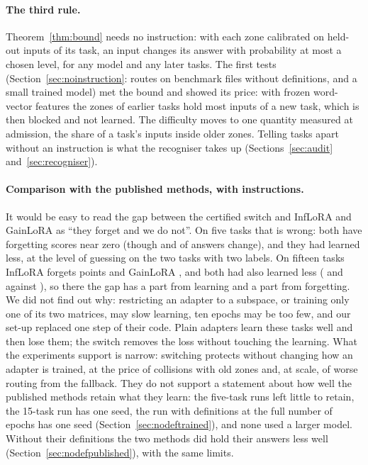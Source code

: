\paragraph{The third rule.} Theorem~\ref{thm:bound} needs no instruction: with each zone calibrated on
held-out inputs of its task, an input changes its answer with probability at most a chosen level, for
any model and any later tasks. The first tests (Section~\ref{sec:noinstruction}: routes on benchmark files without definitions, and a small trained model) met the bound and showed its
price: with frozen word-vector features the zones of earlier tasks hold most inputs of a new task, which
is then blocked and not learned. The difficulty moves to one quantity measured at admission, the share
of a task's inputs inside older zones. Telling tasks apart without an instruction is what the
recogniser takes up (Sections~\ref{sec:audit} and~\ref{sec:recogniser}).

\paragraph{Comparison with the published methods, with instructions.} It would be easy to read the gap
between the certified switch and InfLoRA and GainLoRA as ``they forget and we do not''. On five tasks
that is wrong: both have forgetting scores near zero (though \FiveInfChanged{} and \FiveGainChanged{} of
\FiveInfCompared{} answers change), and they had learned less, at the level of guessing on the two tasks
with two labels. On fifteen tasks InfLoRA forgets \FifteenInfFT{} points and GainLoRA \FifteenGainFT{},
and both had also learned less (\FifteenInfLearned{} and \FifteenGainLearned{} against
\FifteenCertLearned{}), so there the gap has a part from learning and a part from forgetting. We did not find out why: restricting an adapter to a subspace, or training only one of its two matrices, may slow learning,
ten epochs may be too few, and our set-up replaced one step of their code. Plain adapters learn these tasks well and then lose them; the switch removes the loss without touching the learning. What the experiments
support is narrow: switching protects without changing how an adapter is trained, at the price of
collisions with old zones and, at scale, of worse routing from the fallback. They do not support a statement about how
well the published methods retain what they learn: the five-task runs left little to retain, the 15-task run has one seed, the run with definitions at the full number of epochs has one seed (Section~\ref{sec:nodeftrained}), and none used a larger model. Without their definitions the two methods did hold their answers less well (Section~\ref{sec:nodefpublished}), with the same limits.

